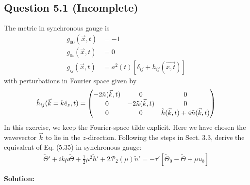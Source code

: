 \documentclass[11pt]{article}
\begin{document}
\subsection{Question 5.1 (Incomplete)}
The metric in synchronous gauge is 
\begin{align*}
    g_{00}(\vec{x},t) &= -1 \\
    g_{0i}(\vec{x},t) &= 0 \\
    g_{ij}(\vec{x},t) &= a^2(t) [\delta_{ij} + h_{ij}(\vec{x, t})]
\end{align*}
with perturbations in Fourier space given by 
\begin{align*}
    \Tilde{h}_{ij}(\vec{k} = k \hat{e}_z, t) = 
    \begin{pmatrix}
        -2\tilde{n}(\vec{k}, t) & 0 & 0 \\
        0 & -2 \tilde{n}(\vec{k}, t) & 0 \\
        0 & 0 & \tilde{h}(\vec{k}, t) + 4 \tilde{n}(\vec{k},t)
    \end{pmatrix}
\end{align*}
In this exercise, we keep the Fourier-space tilde explicit. Here we have chosen the wavevector $\vec{k}$ to lie in the $z$-direction. Following the steps in Sect. 3.3, derive the equivalent of Eq. (5.35) in synchronous gauge: 
\begin{align*}
    \tilde{\Theta}' + ik \mu \tilde{\Theta }  + \frac{1}{2}\mu^2 \tilde{h}' + 2 \mathcal{P}_2(\mu)\tilde{n}' = - \tau' [\tilde{\Theta}_0 - \tilde{\Theta} + \mu u_b]
\end{align*}

\textbf{Solution:}
\end{document}
